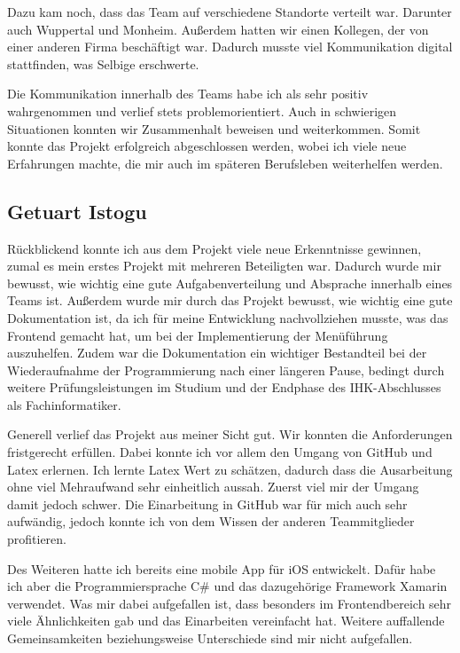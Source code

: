 Dazu kam noch, dass das Team auf verschiedene Standorte verteilt war. Darunter auch Wuppertal und Monheim. Außerdem hatten wir einen Kollegen, der von einer anderen Firma beschäftigt war. Dadurch musste viel Kommunikation digital stattfinden, was Selbige erschwerte. 

Die Kommunikation innerhalb des Teams habe ich als sehr positiv wahrgenommen und verlief stets problemorientiert. Auch in schwierigen Situationen konnten wir Zusammenhalt beweisen und weiterkommen. Somit konnte das Projekt erfolgreich abgeschlossen werden, wobei ich viele neue Erfahrungen machte, die mir auch im späteren Berufsleben weiterhelfen werden.

\clearpage

\subsection{Getuart Istogu}
Rückblickend konnte ich aus dem Projekt viele neue Erkenntnisse gewinnen, zumal es mein erstes Projekt mit mehreren Beteiligten war. Dadurch wurde mir bewusst, wie wichtig eine gute Aufgabenverteilung und Absprache innerhalb eines Teams ist. Außerdem wurde mir durch das Projekt bewusst, wie wichtig eine gute Dokumentation ist, da ich für meine Entwicklung nachvollziehen musste, was das Frontend gemacht hat, um bei der Implementierung der Menüführung auszuhelfen. Zudem war die Dokumentation ein wichtiger Bestandteil bei der Wiederaufnahme der Programmierung nach einer längeren Pause, bedingt durch weitere Prüfungsleistungen im Studium und der Endphase des IHK-Abschlusses als Fachinformatiker.

Generell verlief das Projekt aus meiner Sicht gut. Wir konnten die Anforderungen fristgerecht erfüllen. Dabei konnte ich vor allem den Umgang von GitHub und Latex erlernen. Ich lernte Latex Wert zu schätzen, dadurch dass die Ausarbeitung ohne viel Mehraufwand sehr einheitlich aussah. Zuerst viel mir der Umgang damit jedoch schwer. Die Einarbeitung in GitHub war für mich auch sehr aufwändig, jedoch konnte ich von dem Wissen der anderen Teammitglieder profitieren. 

Des Weiteren hatte ich bereits eine mobile App für iOS entwickelt. Dafür habe ich aber die Programmiersprache C\# und das dazugehörige Framework Xamarin verwendet. Was mir dabei aufgefallen ist, dass besonders im Frontendbereich sehr viele Ähnlichkeiten gab und das Einarbeiten vereinfacht hat. Weitere auffallende Gemeinsamkeiten beziehungsweise Unterschiede sind mir nicht aufgefallen. 


